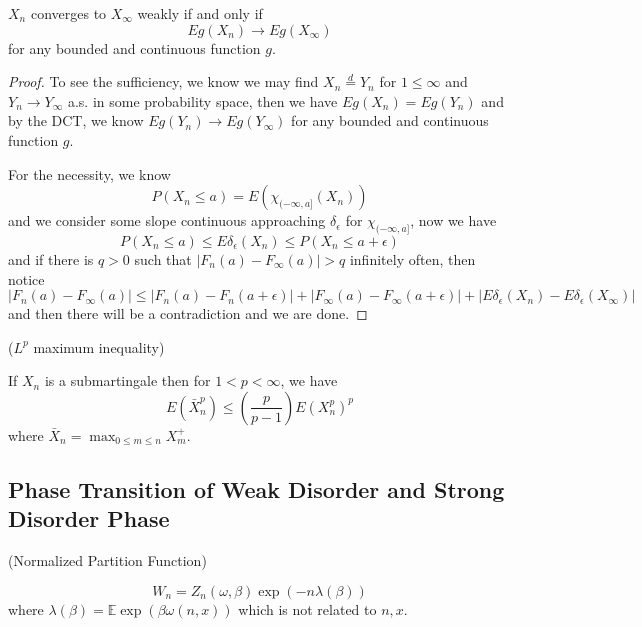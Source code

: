 \begin{theorem}
    $X_n$ converges to $X_{\infty}$ weakly if and only if
    \[Eg(X_n) \to Eg(X_{\infty})\]
    for any bounded and continuous function $g$.
\end{theorem}
\begin{proof}
    To see the sufficiency, we know we may find $X_n \overset{d}{=} Y_n$ for $1\leq \infty$ and $Y_n \to Y_{\infty}$ a.s. in some probability space, then  we have $Eg(X_n) = Eg(Y_n)$ and by the DCT, we know $Eg(Y_n) \to Eg(Y_{\infty})$ for any bounded and continuous function $g$.\par
    For the necessity, we know
    \[
    P(X_n \leq a) = E(\chi_{(-\infty,a]}(X_n))
    \]
    and we consider some slope continuous approaching $\delta_{\epsilon}$ for $\chi_{(-\infty,a]}$, now we have
    \[
    P(X_n \leq a)\leq E\delta_{\epsilon}(X_n) \leq P(X_n \leq a+\epsilon)
    \]
    and if there is $q > 0$ such that $|F_n(a) - F_{\infty}(a)| > q$ infinitely often, then notice
    \[
    |F_n(a) - F_{\infty}(a)| \leq|F_n(a) - F_{n}(a+\epsilon)| + |F_{\infty}(a) - F_{\infty}(a+\epsilon)| + |E\delta_{\epsilon}(X_n)-E\delta_{\epsilon}(X_{\infty})|
    \]
    and then there will be a contradiction and we are done.
\end{proof}

\begin{theorem}
    ($L^p$ maximum inequality)\par
    If $X_n$ is a submartingale then for $1 < p < \infty$, we have
    \[
    E(\bar{X}_n^p) \leq \left(\dfrac{p}{p-1}\right) E(X_n^p)^p
    \]
    where $\bar{X}_n = \max_{0\leq m\leq n} X_m^+$.
\end{theorem}

\subsection{Phase Transition of Weak Disorder and Strong Disorder Phase}

\begin{definition}
    (Normalized Partition Function)\par
    \[W_n = Z_n(\omega,\beta)\exp{(-n\lambda(\beta))}\]
    where $\lambda(\beta) = \mathbb{E}\exp{\left(\beta \omega(n,x)\right)}$ which is not related to $n,x$.
\end{definition}

